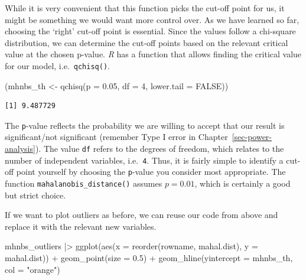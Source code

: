 \documentclass[
  letterpaper,
]{krantz}
\makeatletter
\newenvironment{Shaded}{\begin{snugshade}}{\end{snugshade}}
\newcommand{\AttributeTok}[1]{\textcolor[rgb]{0.40,0.45,0.13}{#1}}
\newcommand{\ConstantTok}[1]{\textcolor[rgb]{0.56,0.35,0.01}{#1}}
\newcommand{\DecValTok}[1]{\textcolor[rgb]{0.68,0.00,0.00}{#1}}
\newcommand{\FloatTok}[1]{\textcolor[rgb]{0.68,0.00,0.00}{#1}}
\newcommand{\FunctionTok}[1]{\textcolor[rgb]{0.28,0.35,0.67}{#1}}
\newcommand{\NormalTok}[1]{\textcolor[rgb]{0.00,0.23,0.31}{#1}}
\newcommand{\OtherTok}[1]{\textcolor[rgb]{0.00,0.23,0.31}{#1}}
\newcommand{\SpecialCharTok}[1]{\textcolor[rgb]{0.37,0.37,0.37}{#1}}
\newcommand{\StringTok}[1]{\textcolor[rgb]{0.13,0.47,0.30}{#1}}
\newenvironment{kframe}{%
\medskip{}
\setlength{\fboxsep}{.8em}
 \def\at@end@of@kframe{}%
 \ifinner\ifhmode%
  \def\at@end@of@kframe{\end{minipage}}%
  \begin{minipage}{\columnwidth}%
 \fi\fi%
 \def\FrameCommand##1{\hskip\@totalleftmargin \hskip-\fboxsep
 \colorbox{shadecolor}{##1}\hskip-\fboxsep
     \hskip-\linewidth \hskip-\@totalleftmargin \hskip\columnwidth}%
 \MakeFramed {\advance\hsize-\width
   \@totalleftmargin\z@ \linewidth\hsize
   \@setminipage}}%
 {\par\unskip\endMakeFramed%
 \at@end@of@kframe}
\renewenvironment{Shaded}{\begin{kframe}}{\end{kframe}}
\makeatother
\begin{document}
While it is very convenient that this function picks the cut-off point
for us, it might be something we would want more control over. As we
have learned so far, choosing the `right' cut-off point is essential.
Since the values follow a chi-square distribution, we can determine the
cut-off points based on the relevant critical value at the chosen
p-value. \emph{R} has a function that allows finding the critical value
for our model, i.e.~\texttt{qchisq()}.

\begin{Shaded}
\begin{Highlighting}[]
\NormalTok{(mhnbs\_th }\OtherTok{\textless{}{-}} \FunctionTok{qchisq}\NormalTok{(}\AttributeTok{p =} \FloatTok{0.05}\NormalTok{,}
                    \AttributeTok{df =} \DecValTok{4}\NormalTok{,}
                    \AttributeTok{lower.tail =} \ConstantTok{FALSE}\NormalTok{))}
\end{Highlighting}
\end{Shaded}

\begin{verbatim}
[1] 9.487729
\end{verbatim}

The \texttt{p}-value reflects the probability we are willing to accept
that our result is significant/not significant (remember Type I error in
Chapter~\ref{sec-power-analysis}). The value \texttt{df} refers to the
degrees of freedom, which relates to the number of independent
variables, i.e.~\texttt{4}. Thus, it is fairly simple to identify a
cut-off point yourself by choosing the \texttt{p}-value you consider
most appropriate. The function \texttt{mahalanobis\_distance()} assumes
\(p = 0.01\), which is certainly a good but strict choice.

If we want to plot outliers as before, we can reuse our code from above
and replace it with the relevant new variables.

\begin{Shaded}
\begin{Highlighting}[]
\NormalTok{mhnbs\_outliers }\SpecialCharTok{|\textgreater{}}
  \FunctionTok{ggplot}\NormalTok{(}\FunctionTok{aes}\NormalTok{(}\AttributeTok{x =} \FunctionTok{reorder}\NormalTok{(rowname, mahal.dist),}
             \AttributeTok{y =}\NormalTok{ mahal.dist)) }\SpecialCharTok{+}
  \FunctionTok{geom\_point}\NormalTok{(}\AttributeTok{size =} \FloatTok{0.5}\NormalTok{) }\SpecialCharTok{+}
  \FunctionTok{geom\_hline}\NormalTok{(}\AttributeTok{yintercept =}\NormalTok{ mhnbs\_th, }\AttributeTok{col =} \StringTok{"orange"}\NormalTok{)}
\end{Highlighting}
\end{Shaded}
\end{document}
